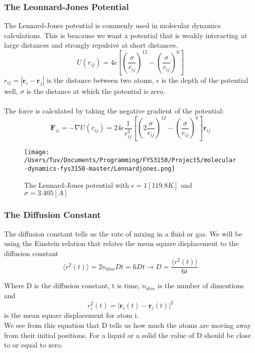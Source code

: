 \documentclass[a4paper, 12pt]{article}
\begin{document}
\subsubsection{The Leonnard-Jones Potential}
The Lennard-Jones potential\cite{LennardJones} is commenly used in molecular dynamics calculations. This is beacause we want a potential that is weakly interacting at large distances and strongly repulsive at short distances.
\begin{equation}
U(r_{ij}) = 4\epsilon \left [\left (\frac{\sigma}{r_{ij}} \right )^{12} - \left ( \frac{\sigma}{r_{ij}} \right )^{6}\right ]
\end{equation}
$r_{ij} = |\mathbf{r}_i - \mathbf{r}_j |$ is the distance between two atoms, $\epsilon$ is the depth of the potential well, $\sigma$ is the distance at which the potential is zero.\\
\\
The force is calculated by taking the negative gradient of the potential:
\begin{equation}
\mathbf{F}_{ij} = - \nabla U(r_{ij} ) = 24\epsilon\frac{1}{r_{ij}^{2}} \left [ \left ( 2\frac{\sigma}{r_{ij}}\right )^{12} - \left (  \frac{\sigma}{r_{ij}} \right )^{6} \right ]\mathbf{r}_{ij}
\end{equation}

\begin{figure}[H]
\centering
\texttt{[image: /Users/Tuv/Documents/Programming/FYS3150/Project5/molecular-dynamics-fys3150-master/Lennardjones.png]}
\caption{The Lennard-Jones potential with $\epsilon = 1 [119.8 K]$ and $\sigma = 3.405 [A]$}
\end{figure}


\subsubsection{The Diffusion Constant}
The diffusion constant tells us the rate of mixing in a fluid or gas. We will be using the Einstein relation that relates the mean square displacement to the diffusion constant\cite{DiffusionConstant} 
\begin{equation}
\langle r^2 (t) \rangle = 2n_{dim} D t = 6Dt \rightarrow D = \frac{\langle r^2 (t) \rangle}{6t}
\end{equation}



Where D is the diffusion constant, t is time, $n_{dim}$ is the number of dimentions and
\begin{equation}
r_i^2 (t)  = |\mathbf{r}_i (t) - \mathbf{r}_i (t)|^2
\end{equation} is the mean square displacement for atom i.\\
We see from this equation that D tells us how much the atoms are moving away from their initial positions. For a liquid or a solid the value of D should be close to or equal to zero.
\end{document}
